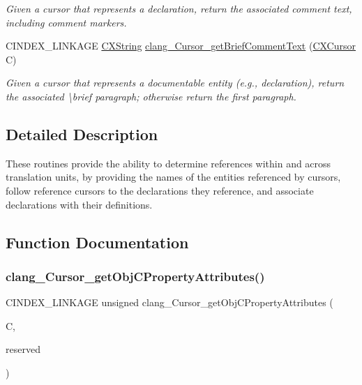 \begin{DoxyCompactItemize}
\begin{DoxyCompactList}\small\item\em Given a cursor that represents a declaration, return the associated comment text, including comment markers. \end{DoxyCompactList}\item 
\mbox{\label{group__CINDEX__CURSOR__XREF_ga6b5282b915d457d728434c0651ea0b8b}} 
C\+I\+N\+D\+E\+X\+\_\+\+L\+I\+N\+K\+A\+GE \mbox{\hyperlink{structCXString}{C\+X\+String}} \mbox{\hyperlink{group__CINDEX__CURSOR__XREF_ga6b5282b915d457d728434c0651ea0b8b}{clang\+\_\+\+Cursor\+\_\+get\+Brief\+Comment\+Text}} (\mbox{\hyperlink{structCXCursor}{C\+X\+Cursor}} C)
\begin{DoxyCompactList}\small\item\em Given a cursor that represents a documentable entity (e.\+g., declaration), return the associated \textbackslash{}brief paragraph; otherwise return the first paragraph. \end{DoxyCompactList}\end{DoxyCompactItemize}


\subsection{Detailed Description}
These routines provide the ability to determine references within and across translation units, by providing the names of the entities referenced by cursors, follow reference cursors to the declarations they reference, and associate declarations with their definitions. 

\subsection{Function Documentation}
\mbox{\label{group__CINDEX__CURSOR__XREF_ga3a964b4c56f8bfb8229a9a08114e2567}} 
\subsubsection{\texorpdfstring{clang\+\_\+\+Cursor\+\_\+get\+Obj\+C\+Property\+Attributes()}{clang\_Cursor\_getObjCPropertyAttributes()}}
{\footnotesize\ttfamily C\+I\+N\+D\+E\+X\+\_\+\+L\+I\+N\+K\+A\+GE unsigned clang\+\_\+\+Cursor\+\_\+get\+Obj\+C\+Property\+Attributes (\begin{DoxyParamCaption}\item[{\mbox{\hyperlink{structCXCursor}{C\+X\+Cursor}}}]{C,  }\item[{unsigned}]{reserved }\end{DoxyParamCaption})}



